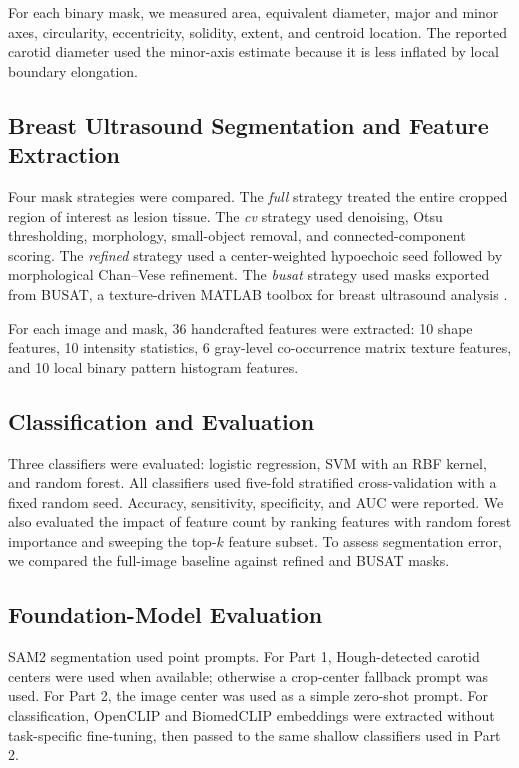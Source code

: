 \documentclass[conference]{IEEEtran}
\begin{document}
For each binary mask, we measured area, equivalent diameter, major and minor axes, circularity, eccentricity, solidity, extent, and centroid location. The reported carotid diameter used the minor-axis estimate because it is less inflated by local boundary elongation.

\subsection{Breast Ultrasound Segmentation and Feature Extraction}
Four mask strategies were compared. The \textit{full} strategy treated the entire cropped region of interest as lesion tissue. The \textit{cv} strategy used denoising, Otsu thresholding, morphology, small-object removal, and connected-component scoring. The \textit{refined} strategy used a center-weighted hypoechoic seed followed by morphological Chan--Vese refinement. The \textit{busat} strategy used masks exported from BUSAT, a texture-driven MATLAB toolbox for breast ultrasound analysis \cite{busat}.

For each image and mask, 36 handcrafted features were extracted: 10 shape features, 10 intensity statistics, 6 gray-level co-occurrence matrix texture features, and 10 local binary pattern histogram features.

\subsection{Classification and Evaluation}
Three classifiers were evaluated: logistic regression, SVM with an RBF kernel, and random forest. All classifiers used five-fold stratified cross-validation with a fixed random seed. Accuracy, sensitivity, specificity, and AUC were reported. We also evaluated the impact of feature count by ranking features with random forest importance and sweeping the top-$k$ feature subset. To assess segmentation error, we compared the full-image baseline against refined and BUSAT masks.

\subsection{Foundation-Model Evaluation}
SAM2 segmentation used point prompts. For Part 1, Hough-detected carotid centers were used when available; otherwise a crop-center fallback prompt was used. For Part 2, the image center was used as a simple zero-shot prompt. For classification, OpenCLIP and BiomedCLIP embeddings were extracted without task-specific fine-tuning, then passed to the same shallow classifiers used in Part 2.
\end{document}
